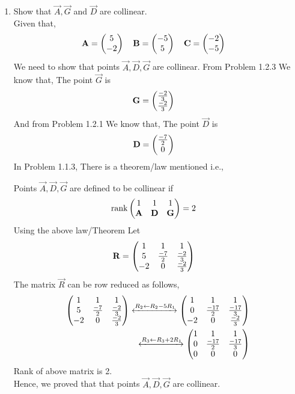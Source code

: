 \documentclass[11pt]{book}
\begin{document}
\begin{enumerate}[label=\thesection.\arabic*.,ref=\thesection.\theenumi]
\item Show that $\vec{A}, \vec{G}$ and $\vec{D}$ are collinear.\\
\solution 
Given that,
\begin{align}
    \mathbf{A} = \begin{pmatrix}5\\-2\end{pmatrix}
    \quad
    \mathbf{B} &= \begin{pmatrix}-5\\5\end{pmatrix}
    \quad
    \mathbf{C} = \begin{pmatrix}-2\\-5\end{pmatrix}
\end{align}
We need to show that points $\vec{A},\vec{D},\vec{G}$ are collinear.
From Problem 1.2.3 We know that, The point $\vec{G}$ is 
\begin{align}
    \mathbf{G} &=\begin{pmatrix}\frac{-2}{3}\\ \frac{-2}{3}\end{pmatrix}
\end{align}
And from Problem 1.2.1 We know that, The point $\vec{D}$ is 
\begin{align}
    \mathbf{D} &=\begin{pmatrix}\frac{-7}{2}\\ 0\end{pmatrix}
\end{align}
In Problem 1.1.3, There is a theorem/law mentioned i.e.,

Points $\vec{A},\vec{D},\vec{G}$ are defined to be collinear if 
\begin{align}
    \text{rank}\begin{pmatrix}
    1 & 1 & 1\\
    \mathbf{A} & \mathbf{D} & \mathbf{G} \\
    \end{pmatrix} &= 2 
\end{align} 
Using the above law/Theorem Let
\begin{align}
    \mathbf{R}&=\begin{pmatrix}
    1 & 1 & 1
    \\
    5 & \frac{-7}{2} & \frac{-2}{3}
    \\
    -2 & 0 & \frac{-2}{3}
    \end{pmatrix} 
\end{align} 
The matrix $\vec{R}$ can be row reduced as follows,
\begin{align}
    \label{eq:mat_row_operations}
    \myvec{
    1 & 1 & 1
    \\
    5 & \frac{-7}{2} & \frac{-2}{3}
    \\
    -2 & 0 & \frac{-2}{3}
    }
     \xleftrightarrow[]{R_2 \leftarrow R_2-5R_1}
    \myvec{
    1 & 1 & 1
    \\
    0 & \frac{-17}{2} & \frac{-17}{3}
    \\
    -2 & 0 & \frac{-2}{3} 
    }
    \\
     \xleftrightarrow[]{R_3\leftarrow R_3+2R_1}
    \myvec{
    1 & 1 & 1
    \\
    0 & \frac{-17}{2} & \frac{-17}{3}
    \\
    0 & 0 &  0
    }
\end{align}
Rank of above matrix is 2.\\
Hence, we proved that that points $\vec{A},\vec{D},\vec{G}$ are collinear.




\end{enumerate}
\end{document}
